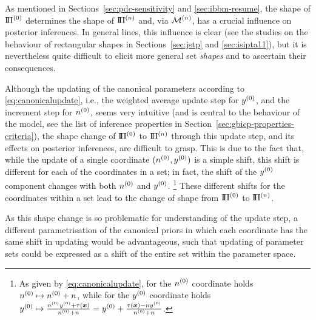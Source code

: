As mentioned in Sections~\ref{sec:pdc-sensitivity} and \ref{sec:ibbm-resume},
the shape of $\text{I}\!\Pi^{(0)}$ determines the shape of $\text{I}\!\Pi^{(n)}$ and, via $\mathcal{M}^{(n)}$, has a crucial influence on posterior inferences.
In general lines, this influence is clear
(see the studies on the behaviour of rectangular shapes in Sections~\ref{sec:jstp} and \ref{sec:isipta11}),
but it is nevertheless quite difficult to elicit more general set \emph{shapes} and to ascertain their consequences.

Although the updating of the canonical parameters according to \eqref{eq:canonicalupdate},
i.e., the weighted average update step for $y^{(0)}$, and the increment step for $n^{(0)}$,
seems very intuitive (and is central to the behaviour of the model,
see the list of inference properties in Section~\ref{sec:gbicp-properties-criteria}),
the shape change of $\text{I}\!\Pi^{(0)}$ to $\text{I}\!\Pi^{(n)}$ through this update step,
and its effects on posterior inferences, are difficult to grasp.
This is due to the fact that,
while the update of a single coordinate $(n^{(0)},y^{(0)})$ is a simple shift,
this shift is different for each of the coordinates in a set;
in fact, the shift of the $y^{(0)}$ component changes with both $n^{(0)}$ and $y^{(0)}$.%
\footnote{As given by \eqref{eq:canonicalupdate},
for the $n^{(0)}$ coordinate holds $n^{(0)} \mapsto n^{(0)}+n$,
while for the $y^{(0)}$ coordinate holds $y^{(0)} \mapsto \frac{n^{(0)}y^{(0)} + \tau({\bm x})}{n^{(0)}+n} = y^{(0)} + \frac{\tau({\bm x})-ny^{(0)}}{n^{(0)}+n}$.}
These different shifts for the coordinates within a set
lead to the change of shape from $\text{I}\!\Pi^{(0)}$ to $\text{I}\!\Pi^{(n)}$.

As this shape change is so problematic for understanding of the update step,
a different parametrisation of the canonical priors
in which each coordinate has the same shift in updating
would be advantageous,
such that updating of parameter sets
could be expressed as a shift of the entire set within the parameter space.

